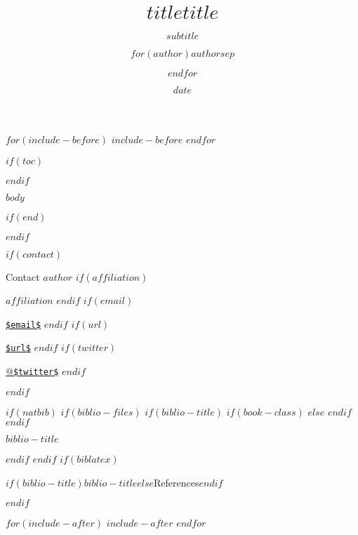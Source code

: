 \documentclass[$if(structurecolor)$xcolor=svgnames,$endif$$if(fontsize)$$fontsize$,$endif$$if(beamer)$ignorenonframetext,$endif$$for(classoption)$$classoption$$sep$,$endfor$xcolor={dvipsnames, table}]{$documentclass$}
\title[$shorttitle$]{$title$}
\title{$title$}
\subtitle{$subtitle$}
\author{$for(author)$$author$$sep$ \and $endfor$}
\institute{$affiliation$}
\date{$date$}
\date{}
\begin{document}
$for(include-before)$
$include-before$
$endfor$

\begin{frame}[plain]
\titlepage
\end{frame}

$if(toc)$
\begin{frame}
\tableofcontents[hideallsubsections]
\end{frame}
$endif$

$body$

$if(end)$
\begin{frame}
\begin{center}
\par
{}
\end{center}
\end{frame}
$endif$

$if(contact)$
\begin{frame}{Contact}
\centering
\textbf{$author$}
$if(affiliation)$
\par
$affiliation$
$endif$
$if(email)$
\par
\href{mailto:$email$}{\nolinkurl{$email$}}
$endif$
$if(url)$
\par
\href{http://$url$}{\nolinkurl{$url$}}
$endif$
$if(twitter)$
\par
\href{http://twitter.com/$twitter$}{@\nolinkurl{$twitter$}}
$endif$
\end{frame}
$endif$

$if(natbib)$
$if(biblio-files)$
$if(biblio-title)$
$if(book-class)$
\renewcommand\bibname{$biblio-title$}
$else$
\renewcommand\refname{$biblio-title$}
$endif$
$endif$
\begin{frame}[allowframebreaks]{$biblio-title$}

\end{frame}
$endif$
$endif$
$if(biblatex)$
\begin{frame}{$if(biblio-title)$$biblio-title$$else$References$endif$}
\let\emph\textit
\printbibliography[heading=none]
\end{frame}
$endif$

$for(include-after)$
$include-after$
$endfor$
\end{document}
